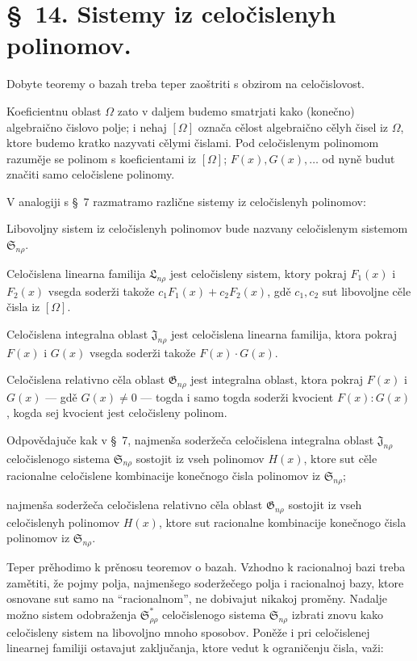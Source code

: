 \documentclass[11pt]{article}
\providecommand{\Ssys}{\mathfrak{S}}
\providecommand{\Jdom}{\mathfrak{J}}
\providecommand{\Gdom}{\mathfrak{G}}
\providecommand{\Lsys}{\mathfrak{L}}
\begin{document}
\section*{\S\ 14. Sistemy iz celočislenyh polinomov.}

Dobyte teoremy o bazah treba teper zaoštriti s obzirom na celočislovost.

Koeficientnu oblast $\Omega$ zato v daljem budemo smatrjati kako (konečno) algebraično čislovo polje; i nehaj $[\Omega]$ označa cělost algebraično cělyh čisel iz $\Omega$, ktore budemo kratko nazyvati cělymi čislami. Pod celočislenym polinomom razuměje se polinom s koeficientami iz $[\Omega]$; $F(x),G(x),\ldots$ od nyně budut značiti samo celočislene polinomy.

V analogiji s \S\ 7 razmatramo različne sistemy iz celočislenyh polinomov:

Libovoljny sistem iz celočislenyh polinomov bude nazvany celočislenym sistemom $\Ssys_{n\rho}$.

Celočislena linearna familija $\Lsys_{n\rho}$ jest celočisleny sistem, ktory pokraj $F_1(x)$ i $F_2(x)$ vsegda soderži takože $c_1F_1(x)+c_2F_2(x)$, gdě $c_1,c_2$ sut libovoljne cěle čisla iz $[\Omega]$.

Celočislena integralna oblast $\Jdom_{n\rho}$ jest celočislena linearna familija, ktora pokraj $F(x)$ i $G(x)$ vsegda soderži takože $F(x)\cdot G(x)$.

Celočislena relativno cěla oblast $\Gdom_{n\rho}$ jest integralna oblast, ktora pokraj $F(x)$ i $G(x)$ --- gdě $G(x)\ne0$ --- togda i samo togda soderži kvocient $F(x):G(x)$, kogda sej kvocient jest celočisleny polinom.

Odpovědajuče kak v \S\ 7, najmenša soderžeča celočislena integralna oblast $\Jdom_{n\rho}$ celočislenogo sistema $\Ssys_{n\rho}$ sostojit iz vseh polinomov $H(x)$, ktore sut cěle racionalne celočislene kombinacije konečnogo čisla polinomov iz $\Ssys_{n\rho}$;

najmenša soderžeča celočislena relativno cěla oblast $\Gdom_{n\rho}$ sostojit iz vseh celočislenyh polinomov $H(x)$, ktore sut racionalne kombinacije konečnogo čisla polinomov iz $\Ssys_{n\rho}$.

Teper prěhodimo k prěnosu teoremov o bazah. Vzhodno k racionalnoj bazi treba zamětiti, že pojmy polja, najmenšego soderžečego polja i racionalnoj bazy, ktore osnovane sut samo na ``racionalnom'', ne dobivajut nikakoj proměny. Nadalje možno sistem odobraženja $\Ssys^*_{\rho\rho}$ celočislenogo sistema $\Ssys_{n\rho}$ izbrati znovu kako celočisleny sistem na libovoljno mnoho sposobov. Poněže i pri celočislenej linearnej familiji ostavajut zaključanja, ktore vedut k ograničenju čisla, važi:
\end{document}
